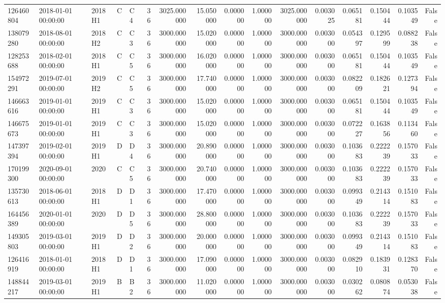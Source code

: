 \begin{tabular}{lllllrrrrrrrrrrr}
126460804 & 2018-01-01 00:00:00 & 2018H1 & C & C4 & 36 & 3025.000000 & 15.050000 & 0.000000 & 1.000000 & 3025.000000 & 0.003025 & 0.065181 & 0.150444 & 0.103549 & False \\
138079280 & 2018-08-01 00:00:00 & 2018H2 & C & C3 & 36 & 3000.000000 & 15.020000 & 0.000000 & 1.000000 & 3000.000000 & 0.003000 & 0.054397 & 0.129599 & 0.088238 & False \\
128253688 & 2018-02-01 00:00:00 & 2018H1 & C & C5 & 36 & 3000.000000 & 16.020000 & 0.000000 & 1.000000 & 3000.000000 & 0.003000 & 0.065181 & 0.150444 & 0.103549 & False \\
154972291 & 2019-07-01 00:00:00 & 2019H2 & C & C5 & 36 & 3000.000000 & 17.740000 & 0.000000 & 1.000000 & 3000.000000 & 0.003000 & 0.082209 & 0.182621 & 0.127394 & False \\
146663616 & 2019-01-01 00:00:00 & 2019H1 & C & C3 & 36 & 3000.000000 & 15.020000 & 0.000000 & 1.000000 & 3000.000000 & 0.003000 & 0.065181 & 0.150444 & 0.103549 & False \\
146675673 & 2019-01-01 00:00:00 & 2019H1 & C & C3 & 36 & 3000.000000 & 15.020000 & 0.000000 & 1.000000 & 3000.000000 & 0.003000 & 0.072227 & 0.163856 & 0.113460 & False \\
147397394 & 2019-02-01 00:00:00 & 2019H1 & D & D4 & 36 & 3000.000000 & 20.890000 & 0.000000 & 1.000000 & 3000.000000 & 0.003000 & 0.103683 & 0.222239 & 0.157033 & False \\
170199300 & 2020-09-01 00:00:00 & 2020 & C & C5 & 36 & 3000.000000 & 20.740000 & 0.000000 & 1.000000 & 3000.000000 & 0.003000 & 0.103683 & 0.222239 & 0.157033 & False \\
135730613 & 2018-06-01 00:00:00 & 2018H1 & D & D1 & 36 & 3000.000000 & 17.470000 & 0.000000 & 1.000000 & 3000.000000 & 0.003000 & 0.099349 & 0.214314 & 0.151083 & False \\
164456389 & 2020-01-01 00:00:00 & 2020 & D & D5 & 36 & 3000.000000 & 28.800000 & 0.000000 & 1.000000 & 3000.000000 & 0.003000 & 0.103683 & 0.222239 & 0.157033 & False \\
149305803 & 2019-03-01 00:00:00 & 2019H1 & D & D2 & 36 & 3000.000000 & 20.000000 & 0.000000 & 1.000000 & 3000.000000 & 0.003000 & 0.099349 & 0.214314 & 0.151083 & False \\
126416919 & 2018-01-01 00:00:00 & 2018H1 & D & D1 & 36 & 3000.000000 & 17.090000 & 0.000000 & 1.000000 & 3000.000000 & 0.003000 & 0.082910 & 0.183931 & 0.128370 & False \\
148844217 & 2019-03-01 00:00:00 & 2019H1 & B & B2 & 36 & 3000.000000 & 11.020000 & 0.000000 & 1.000000 & 3000.000000 & 0.003000 & 0.030262 & 0.080874 & 0.053038 & False \\

\end{tabular}
